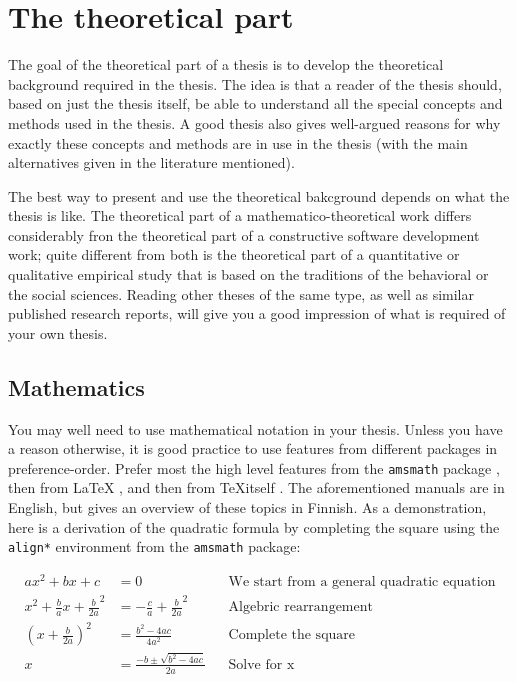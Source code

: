 \documentclass[utf8,english]{gradu3}
\begin{document}
\section{The theoretical part}

The goal of the theoretical part of a thesis is to develop the
theoretical background required in the thesis.  The idea is that a
reader of the thesis should, based on just the thesis itself, be able
to understand all the special concepts and methods used in the thesis.
A good thesis also gives well-argued reasons for why exactly these
concepts and methods are in use in the thesis (with the main
alternatives given in the literature mentioned).

The best way to present and use the theoretical bakcground depends on
what the thesis is like.  The theoretical part of a
mathematico-theoretical work differs considerably fron the theoretical
part of a constructive software development work; quite different from
both is the theoretical part of a quantitative or qualitative
empirical study that is based on the traditions of the behavioral or
the social sciences.  Reading other theses of the same type, as well
as similar published research reports, will give you a good impression
of what is required of your own thesis.

\subsection{Mathematics}

You may well need to use mathematical notation in your thesis. Unless you have
a reason otherwise, it is good practice to use features from different packages
in preference-order. Prefer most the high level features from the
\texttt{amsmath} package \parencite[see][]{amsmath-manual}, then from \LaTeX
\parencite[see][]{lamport94:_latex}, and then from \TeX itself
\parencite[see][]{knuth86:_texbook}. The aforementioned manuals are in English,
but  gives an overview of these topics
in Finnish. As a demonstration, here is a derivation of the quadratic formula
by completing the square using the \texttt{align*} environment from the
\texttt{amsmath} package:

\begin{align*}
  ax^2 + bx + c &= 0 && \text{We start from a general quadratic equation} \\
  x^2 + \frac{b}{a}x + \frac{b}{2a}^2 &= -\frac{c}{a} + \frac{b}{2a}^2 && \text{Algebric rearrangement} \\
  \left(x + \frac{b}{2a}\right)^2 &= \frac{b^2 - 4ac}{4a^2} && \text{Complete the square} \\
  x &= \frac{-b \pm \sqrt{b^2 - 4ac}}{2a} && \text{Solve for x}
\end{align*}
\end{document}
